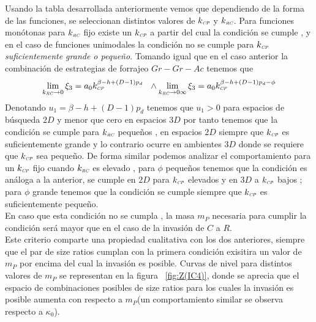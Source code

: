 Usando la tabla desarrollada anteriormente vemos que dependiendo de la forma de las funciones, se seleccionan distintos valores de $k_{\textit{\tiny CP}}$ y $k_{\textit{\tiny RC}}$. Para funciones mon\'otonas para $k_{\textit{\tiny RC}}$ fijo existe un $k_{\textit{\tiny CP}}$ a partir del cual la condici\'on se cumple , y en el caso de funciones unimodales la condici\'on no se cumple para $k_{\textit{\tiny CP}}$ \emph{suficientemente grande o peque\~no}. Tomando igual que en el caso anterior la combinaci\'on de estrategias de forrajeo $Gr-Gr-Ac$ tenemos que 
\begin{equation}
  \lim_{k_{\textit{\tiny RC}} \to 0} \xi_3 = a_0 k_{\textit{\tiny CP}}^{\beta - h + (D-1)p_d}  \ \ \land \lim_{k_{\textit{\tiny RC}} \to 0 \infty} \xi_3 = a_0 k_{\textit{\tiny CP}}^{\beta -h + (D-1)p_d - \phi} 
\end{equation}
Denotando $u_1 = \beta - h + (D-1)p_d$ tenemos que $ u_1 >0$ para espacios de b\'usqueda $2D$ y menor que cero en espacios $3D$ por tanto tenemos que la condici\'on se cumple para $k_{\textit{\tiny RC}}$ peque\~nos , en espacios $2D$ siempre que $k_{\textit{\tiny CP}}$ es suficientemente grande y lo contrario ocurre en ambientes $3D$ donde se requiere que $k_{\textit{\tiny CP}}$ sea peque\~no. De forma similar podemos analizar el comportamiento para un $k_{\textit{\tiny CP}}$ fijo cuando $k_{\textit{\tiny RC}}$ es elevado , para $\phi$ peque\~nos tenemos que la condici\'on es an\'aloga a la anterior, se cumple en $2D$ para $k_{\textit{\tiny CP}}$ elevados y en $3D$ a $k_{\textit{\tiny CP}}$ bajos ; para $\phi$ grande tenemos que la condici\'on se cumple siempre que $k_{\textit{\tiny CP}}$ es suficientemente peque\~no.\\
En caso que esta condici\'on no se cumpla , la masa $m_P$ necesaria para cumplir la condici\'on ser\'a mayor que en el caso de la invasi\'on de $C$ a $R$.\\

Este criterio comparte una propiedad cualitativa con los dos anteriores, siempre que el par de size ratios cumplan con la primera condici\'on exisitira un valor de $m_P$ por encima del cual la invasi\'on es posible. Curvas de nivel para distintos valores de $m_P$ se representan en la figura ~\ref{fig:Z(IC4)}, donde se aprecia que el espacio de combinaciones posibles de size ratios para los cuales la invasi\'on es posible aumenta con respecto a $m_P$(un comportamiento similar se observa respecto a $\kappa_0$).


